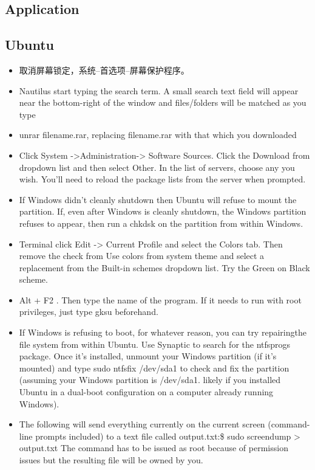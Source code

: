 \documentclass[a4paper,12pt,twoside]{book}
\begin{document}
\begin{CJK*}{UTF8}{song}
\chapter{Application}
\section{Ubuntu}
		\begin{itemize}
		\item 取消屏幕锁定，系统--首选项--屏幕保护程序。
		\item Nautilus start typing the search term. A small search text field will appear near the bottom-right of the window and files/folders will be matched as you type
		\item unrar  filename.rar, replacing filename.rar with that which you downloaded
		\item Click System ->Administration-> Software Sources. Click the Download from dropdown list and then select Other. In the list of servers, choose any you wish. You'll need to reload the package lists from the server when prompted.
		\item If Windows didn't cleanly shutdown then Ubuntu will refuse to mount the partition. If, even after Windows is cleanly shutdown, the Windows partition refuses to appear, then run a chkdsk on the partition from within Windows.
		\item Terminal click Edit -> Current Profile and select the Colors tab. Then remove the check from Use colors from system theme and select a replacement from the Built-in schemes dropdown list. Try the Green on Black scheme.
		\item Alt + F2 . Then type the name of the program. If it needs to run with root privileges, just type gksu beforehand.
		\item If Windows is refusing to boot, for whatever reason, you can try repairingthe file system from within Ubuntu. Use Synaptic to search for the ntfsprogs package. Once it's installed, unmount your Windows partition (if it's mounted) and
		type sudo ntfsfix /dev/sda1 to check and fix the partition (assuming your Windows partition is /dev/sda1. likely if you installed Ubuntu in a dual-boot configuration on a computer already running Windows).
		\item The following will send everything currently on the current screen (command-line prompts included) to a text file called output.txt:\$ sudo screendump > output.txt
		The command has to be issued as root because of permission issues but the resulting file will be owned by you.

\end{itemize}
\end{CJK*}
\end{document}
